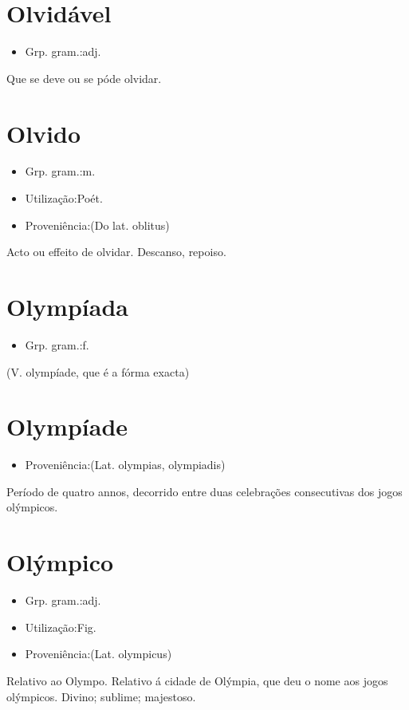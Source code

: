 \section{Olvidável}
\begin{itemize}
\item {Grp. gram.:adj.}
\end{itemize}
Que se deve ou se póde olvidar.
\section{Olvido}
\begin{itemize}
\item {Grp. gram.:m.}
\end{itemize}
\begin{itemize}
\item {Utilização:Poét.}
\end{itemize}
\begin{itemize}
\item {Proveniência:(Do lat. \textunderscore oblitus\textunderscore )}
\end{itemize}
Acto ou effeito de olvidar.
Descanso, repoiso.
\section{Olympíada}
\begin{itemize}
\item {Grp. gram.:f.}
\end{itemize}
(V. \textunderscore olympíade\textunderscore , que é a fórma exacta)
\section{Olympíade}
\begin{itemize}
\item {Proveniência:(Lat. \textunderscore olympias\textunderscore , \textunderscore olympiadis\textunderscore )}
\end{itemize}
Período de quatro annos, decorrido entre duas celebrações consecutivas dos jogos olýmpicos.
\section{Olýmpico}
\begin{itemize}
\item {Grp. gram.:adj.}
\end{itemize}
\begin{itemize}
\item {Utilização:Fig.}
\end{itemize}
\begin{itemize}
\item {Proveniência:(Lat. \textunderscore olympicus\textunderscore )}
\end{itemize}
Relativo ao Olympo.
Relativo á cidade de Olýmpia, que deu o nome aos jogos olýmpicos.
Divino; sublime; majestoso.
